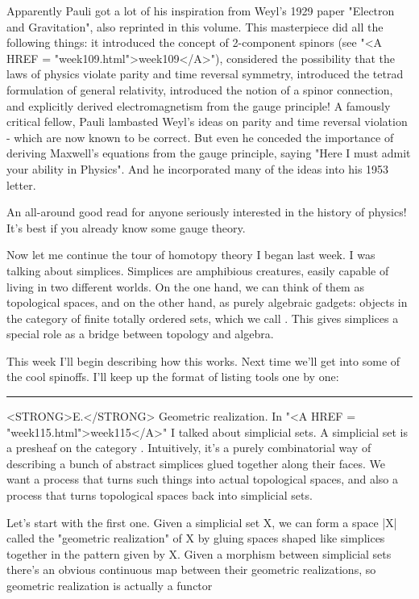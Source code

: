 Apparently Pauli got a lot of his inspiration from Weyl's 1929 paper
"Electron and Gravitation", also reprinted in this volume.  This
masterpiece did all the following things: it introduced the concept of
2-component spinors (see "<A HREF = "week109.html">week109</A>"), considered the possibility that the
laws of physics violate parity and time reversal symmetry, introduced
the tetrad formulation of general relativity, introduced the notion of a
spinor connection, and explicitly derived electromagnetism from the
gauge principle!  A famously critical fellow, Pauli lambasted Weyl's
ideas on parity and time reversal violation - which are now known to
be correct.  But even he conceded the importance of deriving Maxwell's
equations from the gauge principle, saying "Here I must admit your
ability in Physics".  And he incorporated many of the ideas into his 
1953 letter. 

An all-around good read for anyone seriously interested in the history 
of physics!  It's best if you already know some gauge theory.

Now let me continue the tour of homotopy theory I began last week.  I
was talking about simplices.  Simplices are amphibious creatures, easily
capable of living in two different worlds.  On the one hand, we can
think of them as topological spaces, and on the other hand, as purely
algebraic gadgets: objects in the category of finite totally ordered
sets, which we call \Delta .  This gives simplices a special role as a
bridge between topology and algebra.

This week I'll begin describing how this works.  Next time we'll
get into some of the cool spinoffs.  I'll keep up the format of
listing tools one by one:

\par\noindent\rule{\textwidth}{0.4pt}
<STRONG>E.</STRONG>  Geometric realization.  In "<A HREF = "week115.html">week115</A>" I talked about simplicial sets.
A simplicial set is a presheaf on the category \Delta .  Intuitively, it's
a purely combinatorial way of describing a bunch of abstract simplices
glued together along their faces.  We want a process that turns such
things into actual topological spaces, and also a process that turns
topological spaces back into simplicial sets.  

Let's start with the first one.  Given a simplicial set X, we can 
form a space |X| called the "geometric realization" of X by gluing
spaces shaped like simplices together in the pattern given by X.  Given
a morphism between simplicial sets there's an obvious continuous map
between their geometric realizations, so geometric realization is
actually a functor

